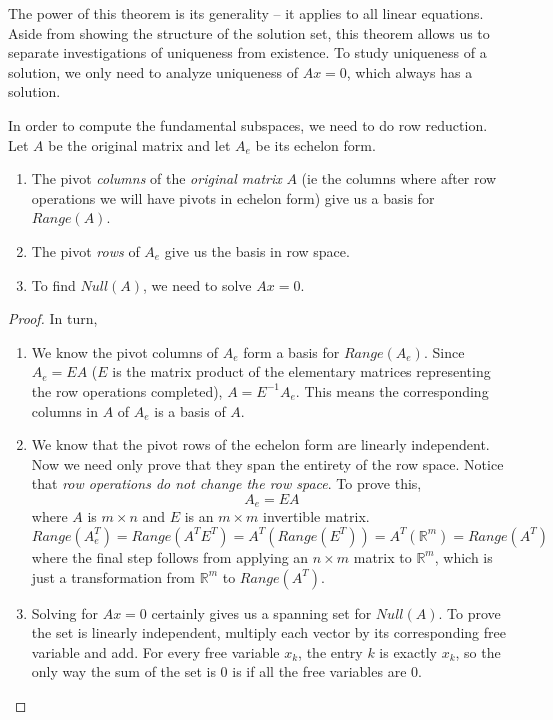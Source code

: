 The power of this theorem is its generality -- it applies to all linear equations. Aside from showing the structure of the solution set, this theorem allows us to separate investigations of uniqueness from existence. To study uniqueness of a solution, we only need to analyze uniqueness of $Ax = 0$, which always has a solution. 

\begin{theorem}
In order to compute the fundamental subspaces, we need to do row reduction. Let $A$ be the original matrix and let $A_{e}$ be its echelon form. 
\begin{enumerate}
	\item The pivot \textit{columns} of the \textit{original matrix} $A$ (ie the columns where after row operations we will have pivots in echelon form) give us a basis for $Range(A)$. 
	\item The pivot \textit{rows} of $A_{e}$ give us the basis in row space. 
	\item To find $Null(A)$, we need to solve $Ax = 0$. 
\end{enumerate}
\end{theorem}

\begin{proof}
In turn, 
\begin{enumerate}
	\item We know the pivot columns of $A_{e}$ form a basis for $Range(A_{e})$. Since $A_{e} = EA$ ($E$ is the matrix product of the elementary matrices representing the row operations completed), $A = E^{-1}A_{e}$. This means the corresponding columns in $A$ of $A_{e}$ is a basis of $A$. 
	
	\item We know that the pivot rows of the echelon form are linearly independent. Now we need only prove that they span the entirety of the row space. Notice that \textit{row operations do not change the row space}. To prove this, 
	$$A_{e} = EA$$
	where $A$ is $m \times n$ and $E$ is an $m \times m$ invertible matrix. 
	$$Range(A_{e}^{T}) = Range(A^{T} E^{T}) = A^{T} (Range(E^{T})) = A^{T} (\mathbb{R}^{m}) = Range(A^{T})$$
	where the final step follows from applying an $n \times m$ matrix to $\mathbb{R}^{m}$, which is just a transformation from $\mathbb{R}^{m}$ to $Range(A^{T})$. 
	
	\item Solving for $Ax = 0$ certainly gives us a spanning set for  $Null(A)$. To prove the set is linearly independent, multiply each vector by its corresponding free variable and add. For every free variable $x_{k}$, the entry $k$ is exactly $x_{k}$, so the only way the sum of the set is $0$ is if all the free variables are $0$. 
\end{enumerate}
\end{proof}

